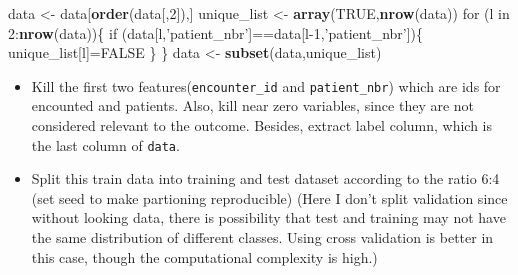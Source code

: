 \documentclass[]{article}
\newenvironment{Shaded}{\begin{snugshade}}{\end{snugshade}}
\newcommand{\KeywordTok}[1]{\textcolor[rgb]{0.13,0.29,0.53}{\textbf{{#1}}}}
\newcommand{\DecValTok}[1]{\textcolor[rgb]{0.00,0.00,0.81}{{#1}}}
\newcommand{\StringTok}[1]{\textcolor[rgb]{0.31,0.60,0.02}{{#1}}}
\newcommand{\OtherTok}[1]{\textcolor[rgb]{0.56,0.35,0.01}{{#1}}}
\newcommand{\NormalTok}[1]{{#1}}
\begin{document}
\begin{Shaded}
\begin{Highlighting}[]
\NormalTok{data <-}\StringTok{ }\NormalTok{data[}\KeywordTok{order}\NormalTok{(data[,}\DecValTok{2}\NormalTok{]),]}
\NormalTok{unique_list <-}\StringTok{ }\KeywordTok{array}\NormalTok{(}\OtherTok{TRUE}\NormalTok{,}\KeywordTok{nrow}\NormalTok{(data))}
\NormalTok{for (l in }\DecValTok{2}\NormalTok{:}\KeywordTok{nrow}\NormalTok{(data))\{}
    \NormalTok{if (data[l,}\StringTok{'patient_nbr'}\NormalTok{]==data[l}\DecValTok{-1}\NormalTok{,}\StringTok{'patient_nbr'}\NormalTok{])\{}
        \NormalTok{unique_list[l]=}\OtherTok{FALSE}
    \NormalTok{\}}
\NormalTok{\}}
\NormalTok{data <-}\StringTok{ }\KeywordTok{subset}\NormalTok{(data,unique_list)}
\end{Highlighting}
\end{Shaded}

\begin{itemize}
\itemsep1pt\parskip0pt
\item
  Kill the first two features(\texttt{encounter\_id} and
  \texttt{patient\_nbr}) which are ids for encounted and patients. Also,
  kill near zero variables, since they are not considered relevant to
  the outcome. Besides, extract label column, which is the last column
  of \texttt{data}.
\end{itemize}

\begin{Shaded}
\end{Shaded}

\begin{itemize}
\itemsep1pt\parskip0pt
\item
  Split this train data into training and test dataset according to the
  ratio 6:4 (set seed to make partioning reproducible) (Here I don't
  split validation since without looking data, there is possibility that
  test and training may not have the same distribution of different
  classes. Using cross validation is better in this case, though the
  computational complexity is high.)
\end{itemize}
\end{document}
